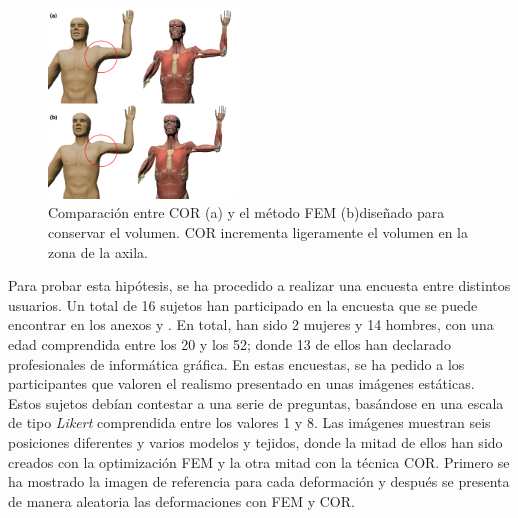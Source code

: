 \begin{figure}[h]%
   \centering
   \includegraphics[width=0.45\textwidth]{IMG/AntCOR}
    \caption{ Comparación entre \ac{COR} (a) y el método \ac{FEM} (b)diseñado para conservar el volumen. \ac{COR} incrementa ligeramente el volumen en la zona de la axila.}
    \label{fig:anatomium}
\end{figure}
 
Para probar esta hipótesis, se ha procedido a realizar una encuesta entre distintos usuarios. Un total de 16 sujetos han participado en la encuesta que se puede encontrar en los anexos \label{anexo:cuestionario1} y \label{anexo:cuestionario2}. En total, han sido 2 mujeres y 14 hombres, con una edad comprendida entre los 20 y los 52; donde 13 de ellos han declarado profesionales de informática gráfica. En estas encuestas, se ha pedido a los participantes que valoren el realismo presentado en unas imágenes estáticas. Estos sujetos debían contestar a una serie de preguntas, basándose en una escala de tipo  \emph{Likert} comprendida entre los valores 1 y 8. Las imágenes muestran seis posiciones diferentes y varios modelos y tejidos, donde la mitad de ellos han sido creados con la optimización \ac{FEM} y la otra mitad con la técnica \ac{COR}. Primero se ha mostrado la imagen de referencia para cada deformación y después se presenta de manera aleatoria las deformaciones con \ac{FEM} y \ac{COR}.

%

